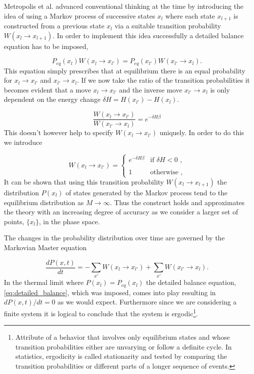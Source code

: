 \documentclass[a4paper]{article}
\begin{document}
Metropolis et al. advanced conventional thinking at the time by
introducing the idea of using a Markov process of successive states
${x_l}$ where each state $x_{l+1}$ is constructed from a previous
state $x_l$ via a suitable transition probability $W(x_l\rightarrow
x_{l+1})$. In order to implement this idea successfully a detailed
balance equation has to be imposed,

\begin{equation}
  P_{eq}(x_l)W(x_l\rightarrow x_{l'}) =P_{eq}(x_{l'})W(x_{l'}\rightarrow
  x_{l}). \label{eq:detailed_balance}
\end{equation}  
This equation simply prescribes that at equilibrium there is an equal
probability for $x_l \rightarrow x_{l'}$ and $x_{l'} \rightarrow
x_{l}$. If we now take the ratio of the transition probabilities it
becomes evident that a move $x_l \rightarrow x_{l'}$ and the inverse
move $x_{l'} \rightarrow x_{l}$ is only dependent on the energy change 
$\delta H= H(x_{l'})-H(x_l)$.

\begin{equation}
  \label{eq:ratio_transition_prob}
  \frac{W(x_l \rightarrow x_{l'})}{W(x_{l'} \rightarrow x_{l})} =
  e^{-\delta H \beta}
\end{equation}
This doesn't however help to specify $W(x_l \rightarrow x_{l'})$
uniquely. In order to do this we introduce

\begin{equation}
  \label{eq:complete_trans_prob}
  W(x_l \rightarrow x_{l'})=
  \begin{cases}
    e^{-\delta H \beta} & \text{if $\delta H < 0$ ,}\\
    & \\
    1 & \text{otherwise ,}
  \end{cases}
\end{equation}
It can be shown that using this transition probability
$W(x_l\rightarrow x_{l+1})$ the distribution $P(x_l)$ of states
generated by the Markov process tend to the equilibrium
distribution as $M \rightarrow \infty$. Thus the construct holds and
approximates the theory with an increasing degree of accuracy as we
consider a larger set of points, $\{ x_l \}$, in the phase space.


The changes in the probability distribution over time are governed by
the Markovian Master equation

\begin{equation}
  \label{eq:markovian_master}
  \frac{dP(x,t)}{dt} = - \sum_{x'} W(x_l \rightarrow
  x_{l'}) + \sum_{x'} W(x_{l'} \rightarrow x_{l}).
\end{equation}
In the thermal limit where $P(x_l) = P_{eq}(x_l)$ the detailed balance
equation, \eqref{eq:detailed_balance}, which was imposed, comes into
play resulting in $dP(x,t)/dt = 0$ as we would expect. Furthermore since 
we are considering a finite system it is logical to conclude that the
system is ergodic\footnote{Attribute of a behavior that involves only equilibrium states and whose transition probabilities either are unvarying or follow a definite cycle. In statistics, ergodicity is called stationarity and tested by comparing the transition probabilities or different parts of a longer sequence of events.}. 
\end{document}
